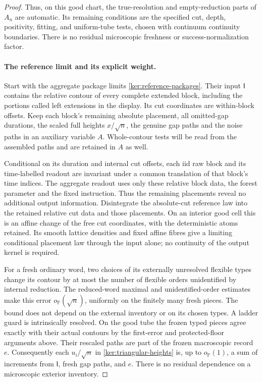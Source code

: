\documentclass[11pt]{article}
\numberwithin{equation}{section}
\theoremstyle{definition}
\theoremstyle{remark}
\newcommand{\1}{\mathbf 1}
\begin{document}
\begin{proof}
Thus, on this good chart, the true-resolution and empty-reduction
parts of \(A_n\) are automatic.  Its remaining conditions are the
specified cut, depth, positivity, fitting, and uniform-tube tests,
chosen with continuum continuity boundaries.  There is no residual
microscopic freshness or success-normalization factor.

\paragraph{The reference limit and its explicit weight.}
Start with the aggregate package limits
\eqref{ker:reference-packages}. Their input \(\mathsf I\) contains the
relative contour of every complete extended block, including the
portions called left extensions in the display. Its cut coordinates
are within-block offsets. Keep each block's remaining absolute
placement, all omitted-gap durations, the scaled full heights
\(x/\sqrt n\), the genuine gap paths and the noise paths in an
auxiliary variable \(A\). Whole-contour tests will be read from the
assembled paths and are retained in \(A\) as well.

Conditional on its duration and internal cut offsets, each iid raw
block and its time-labelled readout are invariant under a common
translation of that block's time indices. The aggregate readout uses
only these relative block data, the forest parameter and the fixed
instruction. Thus the remaining placements reveal no additional
output information. Disintegrate the absolute-cut reference law into
the retained relative cut data and those placements. On an interior
good cell this is an affine change of the free cut coordinates, with
the deterministic atoms retained. Its smooth lattice densities and
fixed affine fibres give a limiting conditional placement law through
the input alone; no continuity of the output kernel is required.

For a fresh ordinary word, two choices of its externally unresolved
flexible types change its contour by at most the number of flexible
orders unidentified by internal reduction. The reduced-word maximal
and unidentified-order estimates
\cite[Lemma~3.13]{SheffieldInventory}
\cite[Lemma~3.7]{GwynneMaoSunFKI} make this error
\(o_{\mathbb P}(\sqrt n)\), uniformly on the finitely many fresh pieces.
The bound does not depend on the external inventory or on its chosen
types. A ladder guard is intrinsically resolved. On the good tube the
frozen typed pieces agree exactly with their actual contours by the
first-error and protected-floor arguments above. Their rescaled paths
are part of the frozen macroscopic record \(e\).
Consequently each \(u_i/\sqrt n\) in
\eqref{ker:triangular-heights} is, up to \(o_{\mathbb P}(1)\), a sum of
increments from \(\mathsf I\), fresh gap paths, and \(e\).
There is no residual dependence on a microscopic exterior inventory.


\end{proof}
\end{document}
